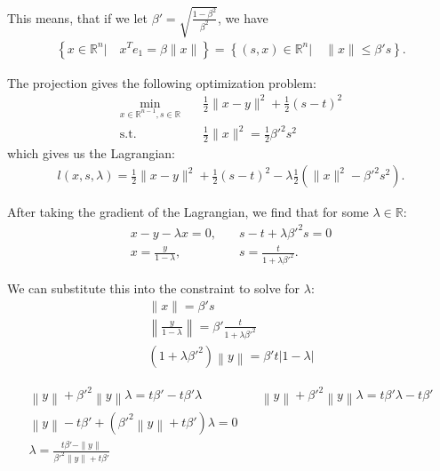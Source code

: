 \documentclass{article}
\theoremstyle{case}
\numberwithin{theorem}{subsection}
\newcommand{\reals}{\mathbb R}
\begin{document}
This means, that if we let $\beta' = \sqrt{\frac{1 - \beta^2}{\beta^2}}$, we have
\begin{align*}
\left\{ x \in \mathbb R^n | \quad x^Te_1 = \beta \|x\| \right\} = \left \{(s, x)\in \mathbb R^n | \quad\|x\| \le \beta' s \right\}.
\end{align*}

The projection gives the following optimization problem:
\begin{align*}
\min_{x \in \mathbb R^{n-1}, s \in \mathbb R} & \quad \frac 1 2 \|x - y\|^2 + \frac 1 2 (s - t)^2 \\
	\textrm{s.t.}		& \quad \frac 1 2 \|x\|^2 = \frac 1 2 {\beta'}^2 s^2
\end{align*}
which gives us the Lagrangian:
\begin{align*}
l(x, s, \lambda) = \frac 1 2 \|x - y \|^2 + \frac 1 2 \left(s - t\right)^2 - \lambda \frac 1 2 \left(\|x\|^2 - {\beta'}^2 s^2\right).
\end{align*}

After taking the gradient of the Lagrangian, we find that for some $\lambda \in \reals$:
\begin{align*}
x - y - \lambda x = 0, & \quad s - t + \lambda {\beta'}^2 s = 0 \\
x = \frac {y}{1 - \lambda}, & \quad s = \frac {t}{1 + \lambda {\beta'}^2 }.
\end{align*}

We can substitute this into the constraint to solve for $\lambda$:
\begin{align*}
\|x\| = {\beta'} s \\
\left\|\frac {y}{1 - \lambda}\right\| = {\beta'} \frac {t}{1 + \lambda {\beta'}^2 } \\
\left(1 + \lambda {\beta'}^2\right) \left\|y\right\| = {\beta'}  {t} \left|1 - \lambda\right|
\end{align*}

\begin{align*}
\left\|y\right\| + {\beta'}^2\left\|y\right\|\lambda = t {\beta'} - t {\beta'} \lambda          &   \quad
\left\|y\right\| + {\beta'}^2\left\|y\right\|\lambda = t {\beta'} \lambda - t {\beta'}					\\
\left\|y\right\|-t {\beta'} +\left( {\beta'}^2\left\|y\right\| + t {\beta'} \right)\lambda = 0  &		\\
\lambda = \frac{t {\beta'} - \|y\|}{{\beta'}^2\|y\| + t {\beta'}}                               &		
\end{align*}
\end{document}
